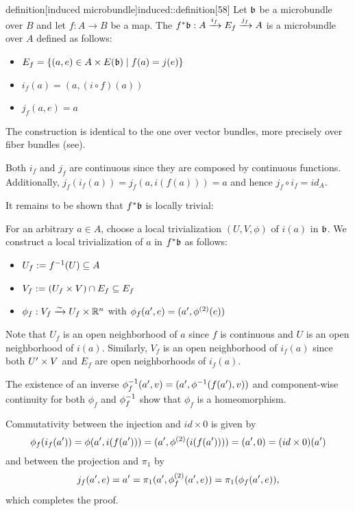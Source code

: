 \begin{mystatement}{definition}[induced microbundle]{induced::definition}[58]
    Let $\bb$ be a microbundle over $B$ and let $f: A \to B$ be a map.
    The  $\bundledef{\ind{f}\bb}{A}{E_f}{i_f}{j_f}$
    is a microbundle over $A$ defined as follows:
    \begin{itemize}
        \item $E_f = \{ (a, e) \in A \cross E(\bb) \mid f(a) = j(e) \}$
        \item $i_f(a) = (a, (i \circ f)(a))$
        \item $j_f(a, e) = a$
    \end{itemize}
\end{mystatement}

\begin{myparagraph}
    The construction is identical to the one over vector bundles,
    more precisely over fiber bundles (see\cite[ch.2,sec.14]{brendon}).
\end{myparagraph}

\begin{myproof}
    Both $i_f$ and $j_f$ are continuous
    since they are composed by continuous functions.
    Additionally, $j_f(i_f(a)) = j_f(a, i(f(a))) = a$ and hence $j_f \circ i_f = id_A$.

    It remains to be shown that $\ind{f}\bb$ is locally trivial:

    For an arbitrary $a \in A$,
    choose a local trivialization $(U, V, \phi)$ of $i(a)$ in $\bb$.
    We construct a local trivialization of $a$ in $\ind{f}\bb$ as follows:
    \begin{itemize}
        \item $U_f := f^{-1}(U) \subseteq{} A$
        \item $V_f := (U_f \times V) \cap E_f \subseteq{} E_f$
        \item $\phi_f: V_f \xrightarrow{\sim} U_f \times \mathbb{R}^n$ with $\phi_f(a', e) = (a', \phi^{(2)}(e))$
    \end{itemize}
    Note that $U_f$ is an open neighborhood of $a$ since $f$ is continuous and $U$ is an open neighborhood of $i(a)$.
    Similarly, $V_f$ is an open neighborhood of $i_f(a)$ since both $U' \times V$ and $E_f$ are open neighborhoods of $i_f(a)$.
    
    The existence of an inverse $\phi_f^{-1}(a', v) = (a', \phi^{-1}(f(a'), v))$
    and component-wise continuity for both $\phi_f$ and $\phi_f^{-1}$ show that $\phi_f$ is a homeomorphism.
    
    Commutativity between the injection and $id \times 0$ is given by
    \[ \phi_f(i_f(a')) = \phi(a', i(f(a'))) = (a', \phi^{(2)}(i(f(a')))) = (a', 0) = (id \times 0)(a') \]
    and between the projection and $\pi_1$ by
    \[ j_f(a', e) = a'  = \pi_1(a', \phi_f^{(2)}(a', e)) = \pi_1(\phi_f(a', e)), \]
    which completes the proof. 
\end{myproof}